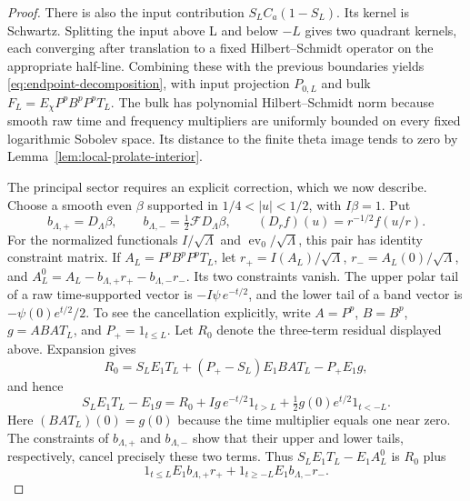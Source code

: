 \begin{proof}
There is also the input contribution $S_LC_a(1-S_L)$.
Its kernel is Schwartz.  Splitting the input above L and below $-L$
gives two quadrant kernels, each converging after translation to a
fixed Hilbert--Schmidt operator on the appropriate half-line.
Combining these with the previous boundaries yields
\eqref{eq:endpoint-decomposition}, with input projection $P_{0,L}$
and bulk $F_L=E_\chi P^pB^pP^pT_L$.
The bulk has polynomial Hilbert--Schmidt norm because smooth raw
time and frequency multipliers are uniformly bounded on every
fixed logarithmic Sobolev space.  Its distance to the finite theta
image tends to zero by Lemma~\ref{lem:local-prolate-interior}.

The principal sector requires an explicit correction, which we now
describe.  Choose a smooth even $\beta$ supported in
$1/4<|u|<1/2$, with $I\beta=1$.  Put
\[
 b_{\Lambda,+}=D_\Lambda\beta,\qquad
 b_{\Lambda,-}=\tfrac12\mathcal F D_\Lambda\beta,
 \qquad (D_r f)(u)=r^{-1/2}f(u/r).
\]
For the normalized functionals $I/\sqrt\Lambda$ and
$\operatorname{ev}_0/\sqrt\Lambda$, this pair has identity
constraint matrix.  If $A_L=P^pB^pP^pT_L$, let
$r_+=I(A_L)/\sqrt\Lambda$, $r_-=A_L(0)/\sqrt\Lambda$, and
$A_L^0=A_L-b_{\Lambda,+}r_+-b_{\Lambda,-}r_-$.
Its two constraints vanish.
The upper polar tail of a raw time-supported vector is
$-I\psi\,e^{-t/2}$, and the lower tail of a band vector is
$-\psi(0)e^{t/2}/2$. To see the cancellation explicitly, write
$A=P^p$, $B=B^p$, $g=ABA T_L$, and $P_+=1_{t\leq L}$.
Let $R_0$ denote the three-term residual displayed above. Expansion gives
\[
 R_0=S_LE_1T_L+(P_+-S_L)E_1BAT_L-P_+E_1g,
\]
and hence
\[
 S_LE_1T_L-E_1g
 =R_0+Ig\,e^{-t/2}1_{t>L}
       +\tfrac12g(0)e^{t/2}1_{t<-L}.
\]
Here $(BAT_L)(0)=g(0)$ because the time multiplier equals one
near zero. The constraints of $b_{\Lambda,+}$ and
$b_{\Lambda,-}$ show that their upper and lower tails,
respectively, cancel precisely these two terms. Thus
$S_LE_1T_L-E_1A_L^0$ is $R_0$ plus
\[
 1_{t\leq L}E_1 b_{\Lambda,+}r_+
       +1_{t\geq-L}E_1 b_{\Lambda,-}r_-.
\]


\end{proof}
